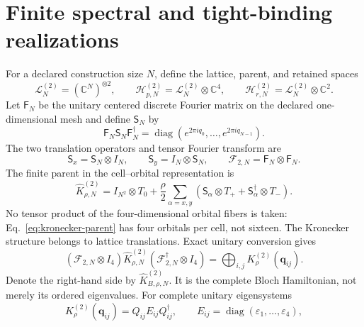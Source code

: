 \documentclass[11pt]{article}
\begin{document}
\section{Finite spectral and tight-binding realizations}

For a declared construction size $N$, define the lattice, parent, and retained spaces
\begin{equation}
 \mathcal L_N^{(2)}=(\mathbb C^N)^{\otimes2},\qquad
 \mathcal H_{p,N}^{(2)}=\mathcal L_N^{(2)}\otimes\mathbb C^4,\qquad
 \mathcal H_{r,N}^{(2)}=\mathcal L_N^{(2)}\otimes\mathbb C^2.
 \label{eq:spaces}
\end{equation}
Let $\mathsf F_N$ be the unitary centered discrete Fourier matrix on the declared
one-dimensional mesh and define $\mathsf S_N$ by
\begin{equation}
 \mathsf F_N\mathsf S_N\mathsf F_N^\dagger
 =\operatorname{diag}\left(e^{2\pi iq_0},\ldots,e^{2\pi iq_{N-1}}\right).
\end{equation}
The two translation operators and tensor Fourier transform are
\begin{equation}
 \mathsf S_x=\mathsf S_N\otimes I_N,
 \qquad \mathsf S_y=I_N\otimes\mathsf S_N,
 \qquad \mathcal F_{2,N}=\mathsf F_N\otimes\mathsf F_N.
\end{equation}
The finite parent in the cell--orbital representation is
\begin{equation}
 \widehat K_{\rho,N}^{(2)}
 =I_{N^2}\otimes T_0
 +\frac\rho2\sum_{\alpha=x,y}
 \left(\mathsf S_\alpha\otimes T_+
 +\mathsf S_\alpha^\dagger\otimes T_-\right).
 \label{eq:kronecker-parent}
\end{equation}
No tensor product of the four-dimensional orbital fibers is taken: Eq.~\eqref{eq:kronecker-parent}
has four orbitals per cell, not sixteen. The Kronecker structure belongs to lattice
translations. Exact unitary conversion gives
\begin{equation}
 (\mathcal F_{2,N}\otimes I_4)\widehat K_{\rho,N}^{(2)}
 (\mathcal F_{2,N}^\dagger\otimes I_4)
 =\bigoplus_{i,j}K_\rho^{(2)}(\mathbf q_{ij}).
 \label{eq:bloch-direct-sum}
\end{equation}
Denote the right-hand side by $\widehat K_{B,\rho,N}^{(2)}$. It is the complete Bloch
Hamiltonian, not merely its ordered eigenvalues. For complete unitary eigensystems
\begin{equation}
 K_\rho^{(2)}(\mathbf q_{ij})
 =Q_{ij}E_{ij}Q_{ij}^\dagger,
 \qquad E_{ij}=\operatorname{diag}(\varepsilon_1,\ldots,\varepsilon_4),
\end{equation}
\end{document}

